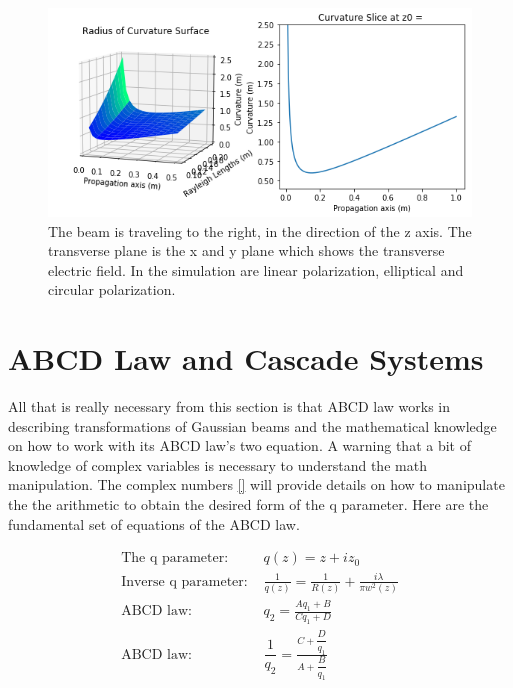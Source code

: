 \documentclass[11pt,a4paper]{book}
\begin{document}
		\begin{figure} 
		\centering
		\includegraphics[scale=0.8]{images/chapter-3/Radius_of_curvature_3d.png}
		\caption{The beam is traveling to the right, in the direction of the z axis. The transverse plane is the x and y plane which shows the transverse electric field. In the simulation are linear polarization, elliptical and circular polarization.}
		\label{fig:Radius_of_curvature_3d.png}
		\end{figure}
	
		
	\section{ABCD Law and Cascade Systems}
		\label{sec:ABCD Law and Transformations}
		
		All that is really necessary from this section is that ABCD law works in describing transformations of Gaussian beams and the mathematical knowledge on how to work with its ABCD law's two equation. A warning that a bit of knowledge of complex variables is necessary to understand the math manipulation. The complex numbers \autoref{} will provide details on how to manipulate the the arithmetic to obtain the desired form of the q parameter. Here are the fundamental set of equations of the ABCD law. 
		
		\begin{equation}
		\label{Q parameter and ABCD law}
		\begin{split}
		\text{The q parameter: } & q(z) = z +iz_0 \\
		\text{Inverse q parameter: }& \frac{1}{q(z)}=\frac{1}{R(z)}+\frac{i\lambda}{\pi w^2(z)}\\
		\text{ABCD law: } & q_2=\frac{Aq_1 + B}{Cq_1 + D} \\
		\text{ABCD law: } & \dfrac{1}{q_2} = \frac{C + \dfrac{D}{q_1}}{A+\dfrac{B}{q_1}}
		\end{split}
		\end{equation}
		
\end{document}
